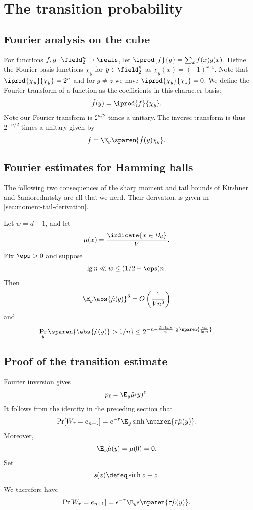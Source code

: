 \section{The transition probability}

\subsection{Fourier analysis on the cube}
For functions $f,g \colon\field_2^n\to\reals$, let
$\iprod{f}{g}=\sum_x f(x)g(x)$. Define the Fourier basis
functions $\chi_y$ for $y\in\field_2^n$ as
$\chi_y(x) = (-1)^{x\cdot y}$. Note that
$\iprod{\chi_y}{\chi_y}=2^n$ and for $y\neq z$ we have
$\iprod{\chi_y}{\chi_z}=0$.
We define the Fourier transform of a function
as the coefficients in this character basis:
$$
\hat f(y) = \iprod{f}{\chi_y}.
$$
Note our Fourier transform is $2^{n/2}$ times a unitary.
The inverse transform is thus $2^{-n/2}$ times a unitary
given by
$$
f = \E_y\sparen{\hat f(y)\chi_y}.
$$

\subsection{Fourier estimates for Hamming balls}

The following two consequences of the sharp moment and tail
bounds of Kirshner and Samorodnitsky \cite[Corollary 1.4 and
Theorem 1.5]{KirshnerS2021} are all that we need.  Their
derivation is given in \autoref{sec:moment-tail-derivation}.

\begin{lemma}
\label{lem:ball-fourier-estimates}
Let $w=d-1$, and let
$$
\mu(x)=\frac{\indicate{x\in\ball}}{V}.
$$
Fix $\eps>0$ and suppose
$$
\lg n\ll w\le(1/2-\eps)n.
$$
Then
$$
\E_y\abs{\hat\mu(y)}^3
=O\left(\frac1{Vn^3}\right)
$$
and
$$
\Pr_y\sparen{\abs{\hat\mu(y)}>1/n}
\le
2^{-n+\frac{2n\lg n}{w}
\lg\nparen{\frac{ew}{\lg n}}}.
$$
\end{lemma}

\subsection{Proof of the transition estimate}

Fourier inversion gives
$$
p_\ell=\E_y\hat\mu(y)^\ell.
$$
It follows from the identity in the preceding section that
$$
\Pr[W_\tau=e_{n+1}]
=e^{-\tau}\E_y\sinh\nparen{\tau\hat\mu(y)}.
$$
Moreover,
$$
\E_y\hat\mu(y)=\mu(0)=0.
$$
Set
$$
s(z)\defeq\sinh z-z.
$$
We therefore have
$$
\Pr[W_\tau=e_{n+1}]
=e^{-\tau}\E_y s\nparen{\tau\hat\mu(y)}.
$$

